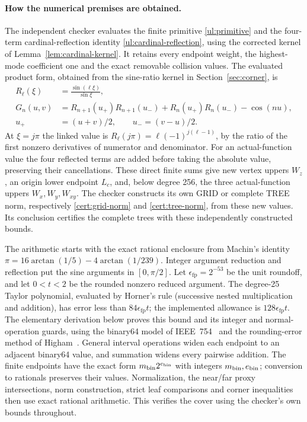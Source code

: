 \paragraph{How the numerical premises are obtained.}
The independent checker evaluates the finite primitive
\eqref{ul:primitive} and the four-term cardinal-reflection identity
\eqref{ul:cardinal-reflection}, using the corrected kernel of
Lemma~\ref{lem:cardinal-kernel}. It retains every endpoint weight, the
highest-mode coefficient one and the exact removable collision values.
The evaluated product form, obtained from the sine-ratio kernel in
Section~\ref{sec:corner}, is
\[
 \begin{aligned}
 R_\ell(\xi)&=\frac{\sin(\ell\xi)}{\sin\xi},\\
 G_n(u,v)&=R_{n+1}(u_+)R_{n+1}(u_-)+R_n(u_+)R_n(u_-)-\cos(nu),\\
 u_+&=(u+v)/2,\qquad u_-=(v-u)/2.
 \end{aligned}
\]
At $\xi=j\pi$ the linked value is
$R_\ell(j\pi)=\ell(-1)^{j(\ell-1)}$, by the ratio of the first
nonzero derivatives of numerator and denominator.
For an actual-function value the four reflected terms are added before
taking the absolute value, preserving their cancellations. These direct
finite sums give new vertex uppers $W_z$, an origin lower endpoint $L_c$,
and, below degree 256, the three actual-function uppers
$W_x,W_y,W_{xy}$. The checker constructs its own GRID or complete TREE
norm, respectively \eqref{cert:grid-norm} and \eqref{cert:tree-norm},
from these new values. Its conclusion certifies the complete trees
with these independently constructed bounds.

The arithmetic starts with the exact rational enclosure from Machin's
identity $\pi=16\arctan(1/5)-4\arctan(1/239)$.
Integer argument reduction and reflection put the sine arguments in
$[0,\pi/2]$. Let $\epsilon_{\mathrm{fp}}=2^{-53}$ be the unit roundoff,
and let $0<t<2$ be the rounded nonzero reduced argument.
The degree-25 Taylor polynomial, evaluated by Horner's rule (successive
nested multiplication and addition), has error less than
$84\epsilon_{\mathrm{fp}}t$; the implemented allowance is
$128\epsilon_{\mathrm{fp}}t$. The elementary derivation below proves this bound and its integer
and normal-operation guards, using the binary64 model of
IEEE~754~\cite{IEEE7542019} and the rounding-error method of
Higham~\cite{Higham2002}.
General interval operations widen
each endpoint to an adjacent binary64 value, and summation widens every
pairwise addition. The finite endpoints have the exact form $m_{\rm bin}2^{e_{\rm bin}}$ with
integers $m_{\rm bin},e_{\rm bin}$; conversion to rationals preserves their values.
Normalization, the near/far proxy intersections, norm construction,
strict leaf comparisons and corner inequalities then use exact rational
arithmetic. This verifies the cover using the checker's own bounds
throughout.

